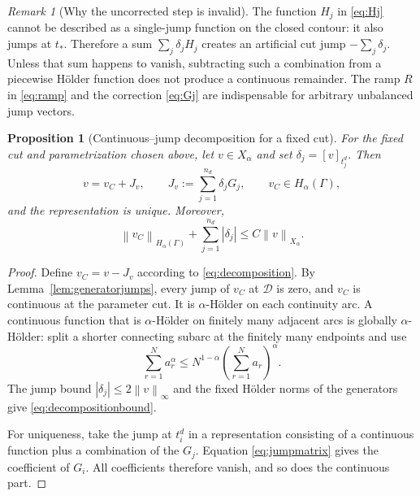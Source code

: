 \documentclass[11pt,a4paper]{amsart}
\theoremstyle{plain}
\newtheorem{proposition}[theorem]{Proposition}
\theoremstyle{definition}
\theoremstyle{remark}
\newtheorem{remark}[theorem]{Remark}
\newcommand{\Ga}{\Gamma}
\newcommand{\D}{\mathcal D}
\newcommand{\norm}[1]{\left\|#1\right\|}
\begin{document}
\begin{remark}[Why the uncorrected step is invalid]\label{rem:rawstep}
The function $H_j$ in \eqref{eq:Hj} cannot be described as a single-jump function on the closed contour: it also jumps at $t_*$.  Therefore a sum $\sum_j\delta_jH_j$ creates an artificial cut jump $-\sum_j\delta_j$.  Unless that sum happens to vanish, subtracting such a combination from a piecewise H\"older function does not produce a continuous remainder.  The ramp $R$ in \eqref{eq:ramp} and the correction \eqref{eq:Gj} are indispensable for arbitrary unbalanced jump vectors.
\end{remark}

\begin{proposition}[Continuous--jump decomposition for a fixed cut]\label{prop:decomposition}
For the fixed cut and parametrization chosen above, let $v\in X_\alpha$ and set
$
        \delta_j=[v]_{t_j^d}.
$
Then
\begin{equation}\label{eq:decomposition}
        v=v_C+J_v,
        \qquad
        J_v:=\sum_{j=1}^{n_d}\delta_jG_j,
        \qquad
        v_C\in H_\alpha(\Ga),
\end{equation}
and the representation is unique.  Moreover,
\begin{equation}\label{eq:decompositionbound}
        \norm{v_C}_{H_\alpha(\Ga)}
        +\sum_{j=1}^{n_d}|\delta_j|
        \le C\norm{v}_{X_\alpha}.
\end{equation}
\end{proposition}

\begin{proof}
Define $v_C=v-J_v$ according to \eqref{eq:decomposition}.  By Lemma~\ref{lem:generatorjumps}, every jump of $v_C$ at $\D$ is zero, and $v_C$ is continuous at the parameter cut.  It is $\alpha$-H\"older on each continuity arc.  A continuous function that is $\alpha$-H\"older on finitely many adjacent arcs is globally $\alpha$-H\"older: split a shorter connecting subarc at the finitely many endpoints and use
\[
        \sum_{r=1}^N a_r^\alpha
        \le N^{1-\alpha}\left(\sum_{r=1}^N a_r\right)^\alpha.
\]
The jump bound $|\delta_j|\le2\norm{v}_{\infty}$ and the fixed H\"older norms of the generators give \eqref{eq:decompositionbound}.

For uniqueness, take the jump at $t_i^d$ in a representation consisting of a continuous function plus a combination of the $G_j$.  Equation \eqref{eq:jumpmatrix} gives the coefficient of $G_i$.  All coefficients therefore vanish, and so does the continuous part.
\end{proof}
\end{document}
